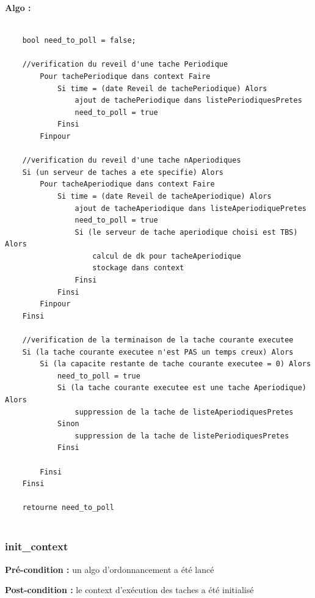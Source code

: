 				\textbf{Algo :} 
					\begin{lstlisting}
					
	bool need_to_poll = false;
	
	//verification du reveil d'une tache Periodique
		Pour tachePeriodique dans context Faire
			Si time = (date Reveil de tachePeriodique) Alors
				ajout de tachePeriodique dans listePeriodiquesPretes
				need_to_poll = true
			Finsi
		Finpour
		
	//verification du reveil d'une tache nAperiodiques
	Si (un serveur de taches a ete specifie) Alors
		Pour tacheAperiodique dans context Faire
			Si time = (date Reveil de tacheAperiodique) Alors
				ajout de tacheAperiodique dans listeAperiodiquePretes
				need_to_poll = true
				Si (le serveur de tache aperiodique choisi est TBS) Alors
					calcul de dk pour tacheAperiodique
					stockage dans context
				Finsi
			Finsi
		Finpour
	Finsi
			
	//verification de la terminaison de la tache courante executee
	Si (la tache courante executee n'est PAS un temps creux) Alors
		Si (la capacite restante de tache courante executee = 0) Alors
			need_to_poll = true
			Si (la tache courante executee est une tache Aperiodique) Alors
				suppression de la tache de listeAperiodiquesPretes
			Sinon
				suppression de la tache de listePeriodiquesPretes
			Finsi
	
		Finsi
	Finsi
		
	retourne need_to_poll
				
					\end{lstlisting}
				
			\subsubsection{init\_context}
				\textbf{Pré-condition :} un algo d'ordonnancement a été lancé
				
				\textbf{Post-condition : }le context d'exécution des taches a été initialisé
				
